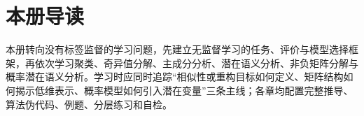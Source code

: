 \documentclass[UTF8,a4paper,11pt,openany]{ctexbook}
\begin{document}
\raggedbottom
\frontmatter
\SLMakeTitle
\chapter*{本册导读}
本册转向没有标签监督的学习问题，先建立无监督学习的任务、评价与模型选择框架，再依次学习聚类、奇异值分解、主成分分析、潜在语义分析、非负矩阵分解与概率潜在语义分析。学习时应同时追踪“相似性或重构目标如何定义、矩阵结构如何揭示低维表示、概率模型如何引入潜在变量”三条主线；各章均配置完整推导、算法伪代码、例题、分层练习和自检。
\SLPrintSourceNotice
\SLPrintContents
\mainmatter
{}






\backmatter
\SLPrintReferences
\begingroup
\addtolength{\textheight}{2pt}%
\printbookindexes
\endgroup
\end{document}
